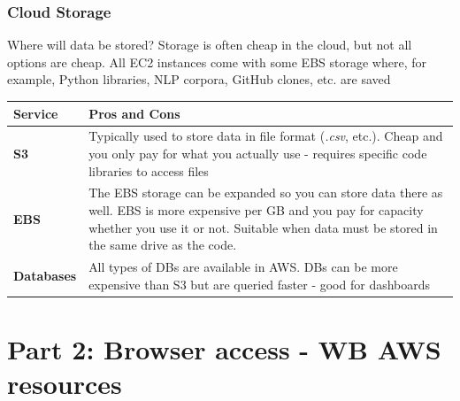 \documentclass[aspectratio=169]{beamer} %
\begin{document}
\begin{frame}
	\frametitle{Cloud Storage}

	Where will data be stored? Storage is often cheap in the cloud,
	but not all options are cheap.
	All EC2 instances come with some EBS storage where,
	for example, Python libraries, NLP corpora,  GitHub clones, etc. are saved
	\vspace{-.5cm}
	\begin{table}
		\begin{tabular}{p{}p{}}
			Service & Pros and Cons\\
			\hline \hline
			\textbf{S3} & Typically used to store data in file format (\textit{.csv}, etc.).
			Cheap and you only pay for what you actually use
			- requires specific code libraries to access files\\[.2cm]
			\textbf{EBS} & The EBS storage can be expanded so you can store data there as well.
			EBS is more expensive per GB and you pay for capacity whether you use it or not.
			Suitable when data must be stored in the same drive as the code.\\[.2cm]
			\textbf{Databases} & All types of DBs are available in AWS.
			DBs can be more expensive than S3 but are queried faster
			- good for dashboards
		\end{tabular}
	\end{table}
\end{frame}

\section{Part 2: Browser access - WB AWS resources}
\end{document}
